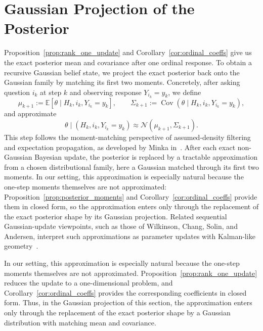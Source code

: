 \documentclass{article}
\begin{document}
\section{Gaussian Projection of the Posterior}\label{sec:moments}

Proposition~\ref{prop:rank_one_update} and Corollary~\ref{cor:ordinal_coeffs}
give us the exact posterior mean and covariance after one ordinal response.
To obtain
a recursive Gaussian belief state, we project the exact
posterior back onto the Gaussian family by matching its first two moments.
Concretely, after asking question $i_k$ at step $k$ and observing response
$Y_{i_k}=y_k$, we define
\begin{equation*}
\mu_{k+1}
:=
\mathbb E[\theta \mid H_k, i_k, Y_{i_k}=y_k],
\qquad
\Sigma_{k+1}
:=
\operatorname{Cov}(\theta \mid H_k, i_k, Y_{i_k}=y_k),
\end{equation*}
and approximate
\begin{equation*}
\theta \mid (H_k, i_k, Y_{i_k}=y_k)
\approx
\mathcal N(\mu_{k+1},\Sigma_{k+1}).
\end{equation*}
This step follows the moment-matching perspective of assumed-density filtering and
expectation propagation, as developed by Minka
in~\cite{minka2001thesis,minka2001ep}. After each exact non-Gaussian Bayesian
update, the posterior is replaced by a tractable approximation from a chosen
distributional family, here a Gaussian matched through its first two moments.
In our setting, this approximation is especially natural because the one-step
moments themselves are not approximated: Proposition~\ref{prop:posterior_moments}
and Corollary~\ref{cor:ordinal_coeffs} provide them in closed form, so the
approximation enters only through the replacement of the exact posterior shape by
its Gaussian projection. Related sequential Gaussian-update viewpoints, such as
those of Wilkinson, Chang, Solin, and Andersen, interpret such approximations as
parameter updates with Kalman-like geometry~\cite{wilkinson2020state}.

In our setting, this approximation is especially natural because the one-step
moments themselves are not approximated. Proposition~\ref{prop:rank_one_update} reduces the
update to a one-dimensional problem, and Corollary~\ref{cor:ordinal_coeffs}
provides the corresponding coefficients in closed form. Thus, in the
 Gaussian projection of this section, the approximation enters only
through the replacement of the exact posterior shape by a Gaussian distribution
with matching mean and covariance.
\end{document}
